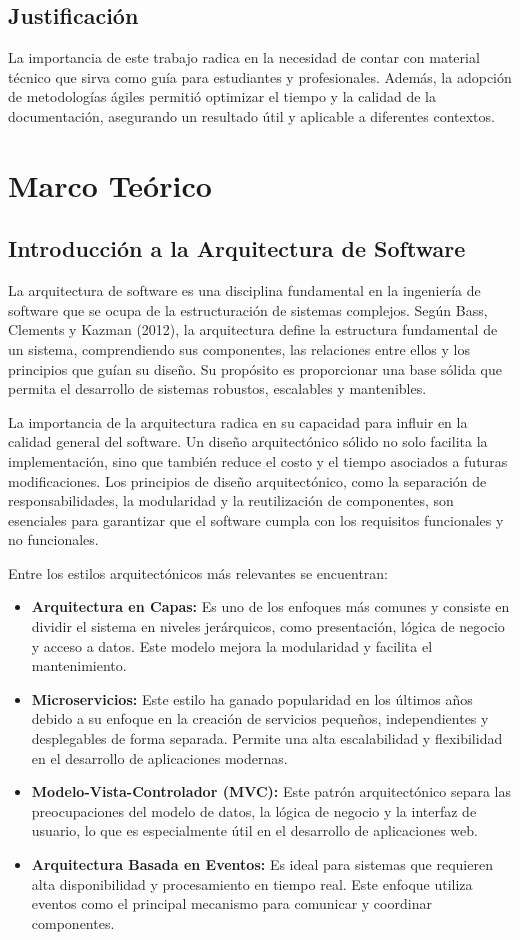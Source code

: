 \documentclass[12pt, a4paper, twocolumn]{article}
\begin{document}
\subsection{Justificación}
La importancia de este trabajo radica en la necesidad de contar con material técnico que sirva como guía para estudiantes y profesionales. Además, la adopción de metodologías ágiles permitió optimizar el tiempo y la calidad de la documentación, asegurando un resultado útil y aplicable a diferentes contextos.

\section{Marco Teórico}

\subsection{Introducción a la Arquitectura de Software}
La arquitectura de software es una disciplina fundamental en la ingeniería de software que se ocupa de la estructuración de sistemas complejos. Según Bass, Clements y Kazman (2012), la arquitectura define la estructura fundamental de un sistema, comprendiendo sus componentes, las relaciones entre ellos y los principios que guían su diseño. Su propósito es proporcionar una base sólida que permita el desarrollo de sistemas robustos, escalables y mantenibles.

La importancia de la arquitectura radica en su capacidad para influir en la calidad general del software. Un diseño arquitectónico sólido no solo facilita la implementación, sino que también reduce el costo y el tiempo asociados a futuras modificaciones. Los principios de diseño arquitectónico, como la separación de responsabilidades, la modularidad y la reutilización de componentes, son esenciales para garantizar que el software cumpla con los requisitos funcionales y no funcionales.

Entre los estilos arquitectónicos más relevantes se encuentran:
\begin{itemize}
    \item \textbf{Arquitectura en Capas:} Es uno de los enfoques más comunes y consiste en dividir el sistema en niveles jerárquicos, como presentación, lógica de negocio y acceso a datos. Este modelo mejora la modularidad y facilita el mantenimiento.
    \item \textbf{Microservicios:} Este estilo ha ganado popularidad en los últimos años debido a su enfoque en la creación de servicios pequeños, independientes y desplegables de forma separada. Permite una alta escalabilidad y flexibilidad en el desarrollo de aplicaciones modernas.
    \item \textbf{Modelo-Vista-Controlador (MVC):} Este patrón arquitectónico separa las preocupaciones del modelo de datos, la lógica de negocio y la interfaz de usuario, lo que es especialmente útil en el desarrollo de aplicaciones web.
    \item \textbf{Arquitectura Basada en Eventos:} Es ideal para sistemas que requieren alta disponibilidad y procesamiento en tiempo real. Este enfoque utiliza eventos como el principal mecanismo para comunicar y coordinar componentes.
\end{itemize}
\end{document}
